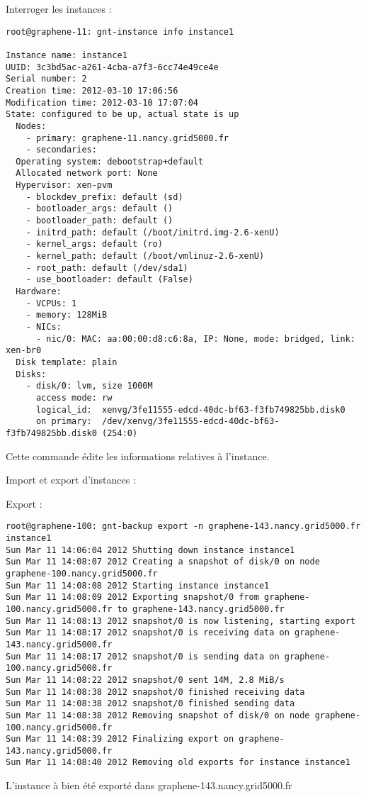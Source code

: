 Interroger les instances :
\begin{lstlisting}
root@graphene-11: gnt-instance info instance1

Instance name: instance1
UUID: 3c3bd5ac-a261-4cba-a7f3-6cc74e49ce4e
Serial number: 2
Creation time: 2012-03-10 17:06:56
Modification time: 2012-03-10 17:07:04
State: configured to be up, actual state is up
  Nodes:
    - primary: graphene-11.nancy.grid5000.fr
    - secondaries: 
  Operating system: debootstrap+default
  Allocated network port: None
  Hypervisor: xen-pvm
    - blockdev_prefix: default (sd)
    - bootloader_args: default ()
    - bootloader_path: default ()
    - initrd_path: default (/boot/initrd.img-2.6-xenU)
    - kernel_args: default (ro)
    - kernel_path: default (/boot/vmlinuz-2.6-xenU)
    - root_path: default (/dev/sda1)
    - use_bootloader: default (False)
  Hardware:
    - VCPUs: 1
    - memory: 128MiB
    - NICs:
      - nic/0: MAC: aa:00:00:d8:c6:8a, IP: None, mode: bridged, link: xen-br0
  Disk template: plain
  Disks:
    - disk/0: lvm, size 1000M
      access mode: rw
      logical_id:  xenvg/3fe11555-edcd-40dc-bf63-f3fb749825bb.disk0
      on primary:  /dev/xenvg/3fe11555-edcd-40dc-bf63-f3fb749825bb.disk0 (254:0)
\end{lstlisting}
Cette commande édite les informations relatives à l'instance.


Import et export d'instances :

Export :
\begin{lstlisting}
root@graphene-100: gnt-backup export -n graphene-143.nancy.grid5000.fr instance1
Sun Mar 11 14:06:04 2012 Shutting down instance instance1
Sun Mar 11 14:08:07 2012 Creating a snapshot of disk/0 on node graphene-100.nancy.grid5000.fr
Sun Mar 11 14:08:08 2012 Starting instance instance1
Sun Mar 11 14:08:09 2012 Exporting snapshot/0 from graphene-100.nancy.grid5000.fr to graphene-143.nancy.grid5000.fr
Sun Mar 11 14:08:13 2012 snapshot/0 is now listening, starting export
Sun Mar 11 14:08:17 2012 snapshot/0 is receiving data on graphene-143.nancy.grid5000.fr
Sun Mar 11 14:08:17 2012 snapshot/0 is sending data on graphene-100.nancy.grid5000.fr
Sun Mar 11 14:08:22 2012 snapshot/0 sent 14M, 2.8 MiB/s
Sun Mar 11 14:08:38 2012 snapshot/0 finished receiving data
Sun Mar 11 14:08:38 2012 snapshot/0 finished sending data
Sun Mar 11 14:08:38 2012 Removing snapshot of disk/0 on node graphene-100.nancy.grid5000.fr
Sun Mar 11 14:08:39 2012 Finalizing export on graphene-143.nancy.grid5000.fr
Sun Mar 11 14:08:40 2012 Removing old exports for instance instance1
\end{lstlisting}
L'instance à bien été exporté dans graphene-143.nancy.grid5000.fr

